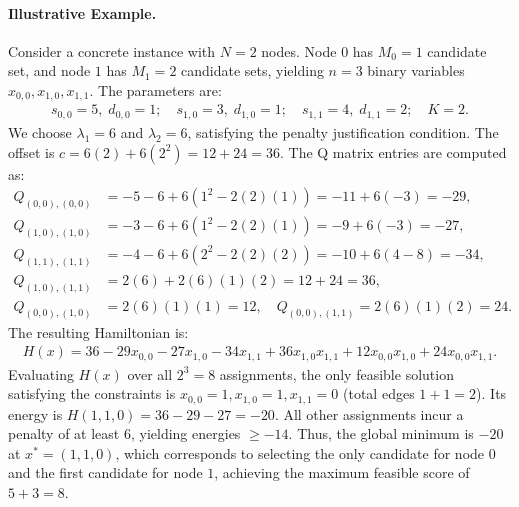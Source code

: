 \documentclass[12pt]{article}
\begin{document}
\paragraph{Illustrative Example.}
Consider a concrete instance with $N=2$ nodes. Node $0$ has $M_0=1$ candidate set, and node $1$ has $M_1=2$ candidate sets, yielding $n=3$ binary variables $x_{0,0}, x_{1,0}, x_{1,1}$. The parameters are:
\begin{align}
    s_{0,0} = 5, \; d_{0,0} = 1; \quad s_{1,0} = 3, \; d_{1,0} = 1; \quad s_{1,1} = 4, \; d_{1,1} = 2; \quad K = 2.
\end{align}
We choose $\lambda_1 = 6$ and $\lambda_2 = 6$, satisfying the penalty justification condition. The offset is $c = 6(2) + 6(2^2) = 12 + 24 = 36$. The Q matrix entries are computed as:
\begin{align}
    Q_{(0,0),(0,0)} &= -5 - 6 + 6(1^2 - 2(2)(1)) = -11 + 6(-3) = -29, \\
    Q_{(1,0),(1,0)} &= -3 - 6 + 6(1^2 - 2(2)(1)) = -9 + 6(-3) = -27, \\
    Q_{(1,1),(1,1)} &= -4 - 6 + 6(2^2 - 2(2)(2)) = -10 + 6(4 - 8) = -34, \\
    Q_{(1,0),(1,1)} &= 2(6) + 2(6)(1)(2) = 12 + 24 = 36, \\
    Q_{(0,0),(1,0)} &= 2(6)(1)(1) = 12, \quad Q_{(0,0),(1,1)} = 2(6)(1)(2) = 24.
\end{align}
The resulting Hamiltonian is:
\begin{align}
    H(x) = 36 - 29x_{0,0} - 27x_{1,0} - 34x_{1,1} + 36x_{1,0}x_{1,1} + 12x_{0,0}x_{1,0} + 24x_{0,0}x_{1,1}.
\end{align}
Evaluating $H(x)$ over all $2^3=8$ assignments, the only feasible solution satisfying the constraints is $x_{0,0}=1, x_{1,0}=1, x_{1,1}=0$ (total edges $1+1=2$). Its energy is $H(1,1,0) = 36 - 29 - 27 = -20$. All other assignments incur a penalty of at least $6$, yielding energies $\ge -14$. Thus, the global minimum is $-20$ at $x^* = (1,1,0)$, which corresponds to selecting the only candidate for node $0$ and the first candidate for node $1$, achieving the maximum feasible score of $5+3=8$.
\end{document}
